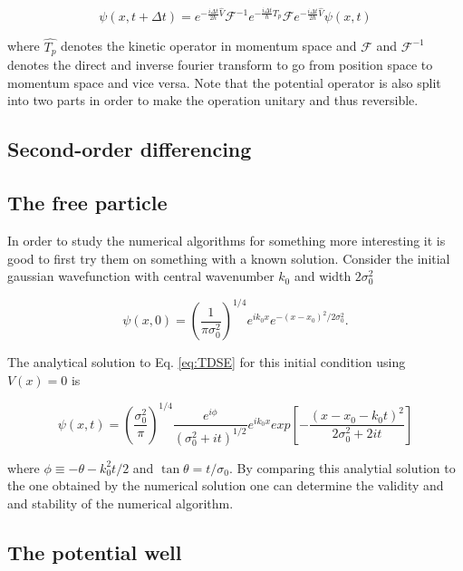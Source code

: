 \begin{equation}
  \label{eq:split}
  \psi(x,t+\Delta t) = e^{-\frac{i\Delta t}{2\hbar}\hat{V}}\mathcal F^{-1} e^{-\frac{i\Delta t}{\hbar}\hat{T_p}}\mathcal F e^{-\frac{i\Delta t}{2\hbar}\hat{V}} \psi(x,t)
\end{equation}

where $\hat{T_p}$ denotes the kinetic operator in momentum space and $\mathcal F$ and $\mathcal F^{-1}$ denotes the direct and inverse fourier transform to go from position space to momentum space and vice versa. Note that the potential operator is also split into two parts in order to make the operation unitary and thus reversible.

\subsection{Second-order differencing}

\subsection{The free particle}

In order to study the numerical algorithms for something more interesting it is good to first try them on something with a known solution. Consider the initial gaussian wavefunction with central wavenumber $k_0$ and width $2\sigma_0^2$

\begin{equation}
  \label{eq:init}
  \psi(x,0) = \left( \frac{1}{\pi \sigma_0^2} \right)^{1/4} e^{ik_0x}e^{-(x-x_0)^2/2\sigma_0^2}.
\end{equation}

The analytical solution to Eq. \eqref{eq:TDSE} for this initial condition using $V(x)=0$ is

\begin{equation}
  \label{eq:free}
  \psi(x,t) = \left(\frac{\sigma_0^2}{\pi}\right)^{1/4} \frac{e^{i\phi}}{(\sigma_0^2 + it)^{1/2}} e^{ik_0x} exp \left[ - \frac{(x-x_0-k_0t)^2}{2\sigma_0^2 + 2it}\right]
\end{equation}

where $\phi \equiv -\theta -k_0^2t/2$ and $\tan \theta = t/\sigma_0$. By comparing this analytial solution to the one obtained by the numerical solution one can determine the validity and and stability of the numerical algorithm.

\subsection{The potential well}

